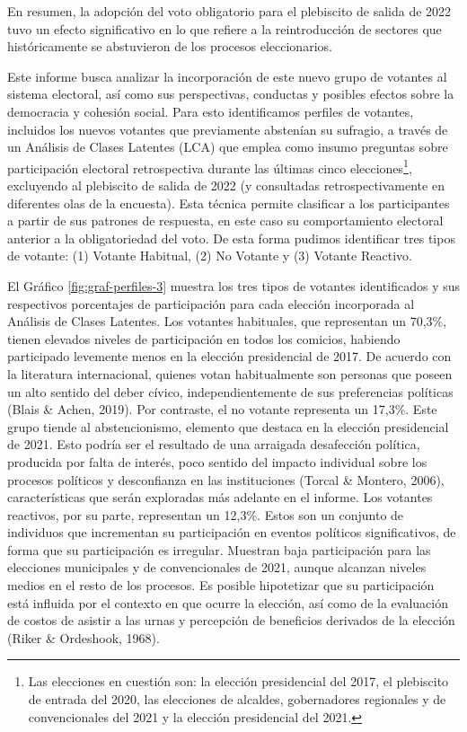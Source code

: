 \documentclass[
  12pt,
]{book}
\begin{document}
En resumen, la adopción del voto obligatorio para el plebiscito de salida de 2022 tuvo un efecto significativo en lo que refiere a la reintroducción de sectores que históricamente se abstuvieron de los procesos eleccionarios.

Este informe busca analizar la incorporación de este nuevo grupo de votantes al sistema electoral, así como sus perspectivas, conductas y posibles efectos sobre la democracia y cohesión social. Para esto identificamos perfiles de votantes, incluidos los nuevos votantes que previamente abstenían su sufragio, a través de un Análisis de Clases Latentes (LCA) que emplea como insumo preguntas sobre participación electoral retrospectiva durante las últimas cinco elecciones\footnote{Las elecciones en cuestión son: la elección presidencial del 2017, el plebiscito de entrada del 2020, las elecciones de alcaldes, gobernadores regionales y de convencionales del 2021 y la elección presidencial del 2021.}, excluyendo al plebiscito de salida de 2022 (y consultadas retrospectivamente en diferentes olas de la encuesta). Esta técnica permite clasificar a los participantes a partir de sus patrones de respuesta, en este caso su comportamiento electoral anterior a la obligatoriedad del voto. De esta forma pudimos identificar tres tipos de votante: (1) Votante Habitual, (2) No Votante y (3) Votante Reactivo.

El Gráfico \ref{fig:graf-perfiles-3} muestra los tres tipos de votantes identificados y sus respectivos porcentajes de participación para cada elección incorporada al Análisis de Clases Latentes. Los votantes habituales, que representan un 70,3\%, tienen elevados niveles de participación en todos los comicios, habiendo participado levemente menos en la elección presidencial de 2017. De acuerdo con la literatura internacional, quienes votan habitualmente son personas que poseen un alto sentido del deber cívico, independientemente de sus preferencias políticas (Blais \& Achen, 2019). Por contraste, el no votante representa un 17,3\%. Este grupo tiende al abstencionismo, elemento que destaca en la elección presidencial de 2021. Esto podría ser el resultado de una arraigada desafección política, producida por falta de interés, poco sentido del impacto individual sobre los procesos políticos y desconfianza en las instituciones (Torcal \& Montero, 2006), características que serán exploradas más adelante en el informe. Los votantes reactivos, por su parte, representan un 12,3\%. Estos son un conjunto de individuos que incrementan su participación en eventos políticos significativos, de forma que su participación es irregular. Muestran baja participación para las elecciones municipales y de convencionales de 2021, aunque alcanzan niveles medios en el resto de los procesos. Es posible hipotetizar que su participación está influida por el contexto en que ocurre la elección, así como de la evaluación de costos de asistir a las urnas y percepción de beneficios derivados de la elección (Riker \& Ordeshook, 1968).
\end{document}
